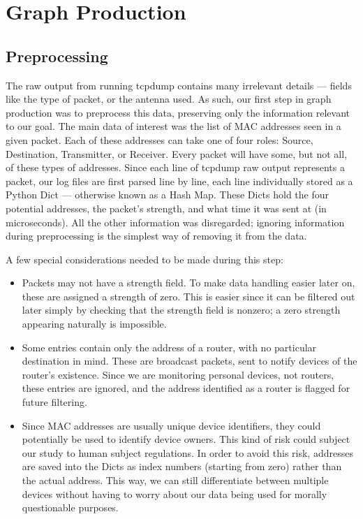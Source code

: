 \section{Graph Production}

\subsection{Preprocessing}


The raw output from running tcpdump contains many irrelevant details --- fields like the type of packet, or the antenna used.
As such, our first step in graph production was to preprocess this data, preserving only the information relevant to our goal.
The main data of interest was the list of MAC addresses seen in a given packet.
Each of these addresses can take one of four roles: Source, Destination, Transmitter, or Receiver.
Every packet will have some, but not all, of these types of addresses.
Since each line of tcpdump raw output represents a packet, our log files are first parsed line by line, each line individually stored as a Python Dict --- otherwise known as a Hash Map.
These Dicts hold the four potential addresses, the packet's strength, and what time it was sent at (in microseconds).
All the other information was disregarded; ignoring information during preprocessing is the simplest way of removing it from the data.

A few special considerations needed to be made during this step:
\begin{itemize}
\item Packets may not have a strength field.
  To make data handling easier later on, these are assigned a strength of zero.
  This is easier since it can be filtered out later simply by checking that the strength field is nonzero; a zero strength appearing naturally is impossible. 
\item Some entries contain only the address of a router, with no particular destination in mind.
  These are broadcast packets, sent to notify devices of the router's existence.
  Since we are monitoring personal devices, not routers, these entries are ignored, and the address identified as a router is flagged for future filtering.
\item Since MAC addresses are usually unique device identifiers, they could potentially be used to identify device owners.
  This kind of risk could subject our study to human subject regulations.
  In order to avoid this risk, addresses are saved into the Dicts as index numbers (starting from zero) rather than the actual address.
  This way, we can still differentiate between multiple devices without having to worry about our data being used for morally questionable purposes.
\end{itemize}

